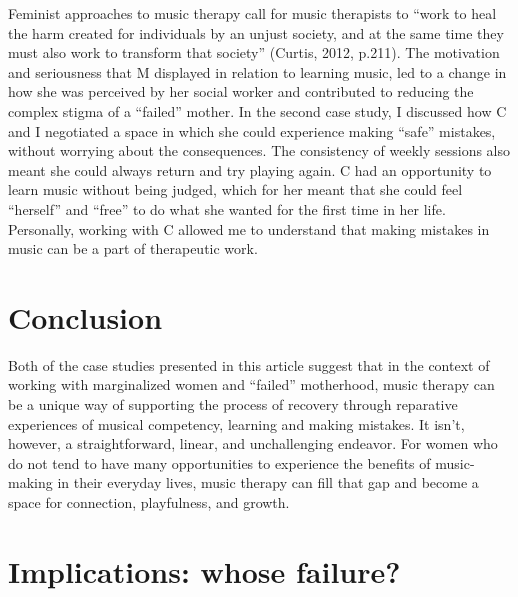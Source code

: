 \documentclass[authordate, empirical]{jote-new-article}
\begin{document}
Feminist approaches to music therapy call for music therapists to “work to heal the harm created for individuals by an unjust society, and at the same time they must also work to transform that society” (Curtis, 2012, p.211). The motivation and seriousness that M displayed in relation to learning music, led to a change in how she was perceived by her social worker and contributed to reducing the complex stigma of a “failed” mother. In the second case study, I discussed how C and I negotiated a space in which she could experience making “safe” mistakes, without worrying about the consequences. The consistency of weekly sessions also meant she could always return and try playing again. C had an opportunity to learn music without being judged, which for her meant that she could feel “herself” and “free” to do what she wanted for the first time in her life. Personally, working with C allowed me to understand that making mistakes in music can be a part of therapeutic work.







\section{Conclusion}







Both of the case studies presented in this article suggest that in the context of working with marginalized women and “failed” motherhood, music therapy can be a unique way of supporting the process of recovery through reparative experiences of musical competency, learning and making mistakes. It isn't, however, a straightforward, linear, and unchallenging endeavor. For women who do not tend to have many opportunities to experience the benefits of music-making in their everyday lives, music therapy can fill that gap and become a space for connection, playfulness, and growth.







\section{Implications: whose failure?}
\end{document}
